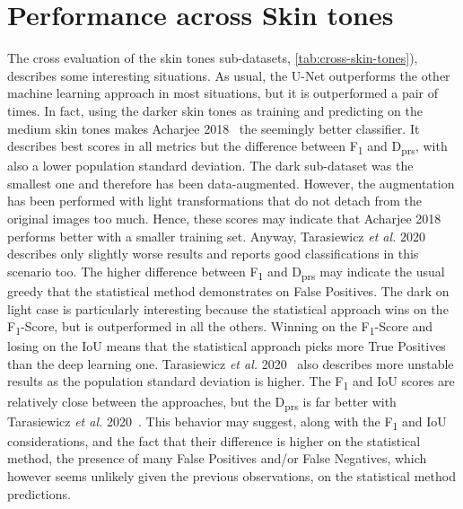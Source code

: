 \FloatBarrier
\section{Performance across Skin tones}

The cross evaluation of the skin tones sub-datasets, \autoref{tab:cross-skin-tones}), describes some interesting situations.
As usual, the U-Net outperforms the other machine learning approach in most situations, but it is outperformed a pair of times.
In fact, using the darker skin tones as training and predicting on the medium skin tones makes Acharjee 2018~\cite{acharjee2018skin} the seemingly better classifier.
It describes best scores in all metrics but the difference between F\textsubscript{1} and D\textsubscript{prs}, with also a lower population standard deviation.
The dark sub-dataset was the smallest one and therefore has been data-augmented.
However, the augmentation has been performed with light transformations that do not detach from the original images too much.
Hence, these scores may indicate that Acharjee 2018~\cite{acharjee2018skin} performs better with a smaller training set.
Anyway, Tarasiewicz \textit{et al.} 2020~\cite{tarasiewicz2020skinny} describes only slightly worse results and reports good classifications in this scenario too.
The higher difference between F\textsubscript{1} and D\textsubscript{prs} may indicate the usual greedy that the statistical method demonstrates on False Positives.
The dark on light case is particularly interesting because the statistical approach wins on the F\textsubscript{1}-Score, but is outperformed in all the others.
Winning on the F\textsubscript{1}-Score and losing on the IoU means that the statistical approach picks more True Positives than the deep learning one.
Tarasiewicz \textit{et al.} 2020~\cite{tarasiewicz2020skinny} also describes more unstable results as the population standard deviation is higher.
The F\textsubscript{1} and IoU scores are relatively close between the approaches, but the D\textsubscript{prs} is far better with Tarasiewicz \textit{et al.} 2020~\cite{tarasiewicz2020skinny}.
This behavior may suggest, along with the F\textsubscript{1} and IoU considerations, and the fact that their difference is higher on the statistical method, the presence of many False Positives and/or False Negatives, which however seems unlikely given the previous observations, on the statistical method predictions.
